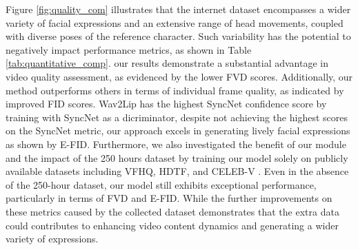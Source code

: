 
Figure \ref{fig:quality_com} illustrates that the internet dataset encompasses a wider variety of facial expressions and an extensive range of head movements, coupled with diverse poses of the reference character. Such variability has the potential to negatively impact performance metrics, as shown in Table \ref{tab:quantitative_comp}.  our results demonstrate a substantial advantage in video quality assessment, as evidenced by the lower FVD scores. Additionally, our method outperforms others in terms of individual frame quality, as indicated by improved FID scores. Wav2Lip has the highest SyncNet confidence score by training with SyncNet as a dicriminator\cite{dreamtalk}, despite not achieving the highest scores on the SyncNet metric, our approach excels in generating lively facial expressions as shown by E-FID. Furthermore, we also investigated the benefit of our module and the impact of the 250 hours dataset by training our model solely on publicly available datasets including VFHQ, HDTF, and CELEB-V \cite{zhu2022celebvhq}. Even in the absence of the 250-hour dataset, our model still exhibits exceptional performance, particularly in terms of FVD and E-FID. While the further improvements on these metrics caused by the collected dataset demonstrates that the extra data could contributes to enhancing video content dynamics and generating a wider variety of expressions.

